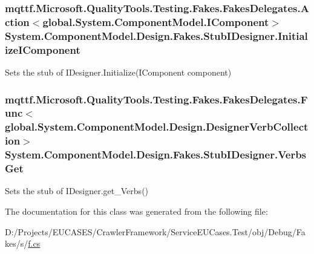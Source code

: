 \hypertarget{class_system_1_1_component_model_1_1_design_1_1_fakes_1_1_stub_i_designer_a8ba92f3d5c85ba391e196060c637d3e3}{
\subsubsection[{Initialize\-I\-Component}]{\setlength{\rightskip}{0pt plus 5cm}mqttf.\-Microsoft.\-Quality\-Tools.\-Testing.\-Fakes.\-Fakes\-Delegates.\-Action$<$global.\-System.\-Component\-Model.\-I\-Component$>$ System.\-Component\-Model.\-Design.\-Fakes.\-Stub\-I\-Designer.\-Initialize\-I\-Component}}\label{class_system_1_1_component_model_1_1_design_1_1_fakes_1_1_stub_i_designer_a8ba92f3d5c85ba391e196060c637d3e3}


Sets the stub of I\-Designer.\-Initialize(\-I\-Component component)

\hypertarget{class_system_1_1_component_model_1_1_design_1_1_fakes_1_1_stub_i_designer_a99505d97e63bd13cba1fffdad5948f73}{
\subsubsection[{Verbs\-Get}]{\setlength{\rightskip}{0pt plus 5cm}mqttf.\-Microsoft.\-Quality\-Tools.\-Testing.\-Fakes.\-Fakes\-Delegates.\-Func$<$global.\-System.\-Component\-Model.\-Design.\-Designer\-Verb\-Collection$>$ System.\-Component\-Model.\-Design.\-Fakes.\-Stub\-I\-Designer.\-Verbs\-Get}}\label{class_system_1_1_component_model_1_1_design_1_1_fakes_1_1_stub_i_designer_a99505d97e63bd13cba1fffdad5948f73}


Sets the stub of I\-Designer.\-get\-\_\-\-Verbs()



The documentation for this class was generated from the following file\-:\begin{DoxyCompactItemize}
\item 
D\-:/\-Projects/\-E\-U\-C\-A\-S\-E\-S/\-Crawler\-Framework/\-Service\-E\-U\-Cases.\-Test/obj/\-Debug/\-Fakes/s/\hyperlink{s_2f_8cs}{f.\-cs}\end{DoxyCompactItemize}
